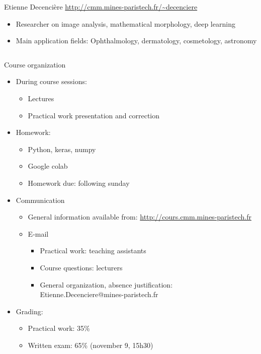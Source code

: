 \documentclass[xcolor=pdftex,dvipsnames,table,mathserif]{beamer}
\begin{document}
{\begin{columns}
\begin{column}{.8\textwidth}
    \begin{block}{Etienne Decencière \hfill \scriptsize{\url{http://cmm.mines-paristech.fr/\~decenciere}}}
      \scriptsize{
    \begin{itemize}
    \item Researcher on image analysis, mathematical morphology, deep learning
    \item Main application fields: Ophthalmology, dermatology, cosmetology, astronomy
    \end{itemize}
    }
  \end{block}

  \end{column}
\end{columns}

}

\begin{frame}{Course organization}

  \begin{itemize}
  \item During course sessions:
    \begin{itemize}
    \item Lectures
    \item Practical work presentation and correction
    \end{itemize}
  \item Homework:
    \begin{itemize}
    \item Python, keras, numpy
    \item Google colab
    \item Homework due: following sunday
    \end{itemize}
  \item Communication
  \begin{itemize}
  \item General information available from: \url{http://cours.cmm.mines-paristech.fr}
  \item E-mail
    \begin{itemize}
    \item Practical work: teaching assistants
    \item Course questions: lecturers
    \item General organization, absence justification: Etienne.Decenciere@mines-paristech.fr
    \end{itemize}
  \end{itemize}
\item Grading:
\begin{itemize}
\item Practical work: 35\%
\item Written exam: 65\% (november 9, 15h30)
\end{itemize}

   \end{itemize}
\end{frame}
\end{document}
